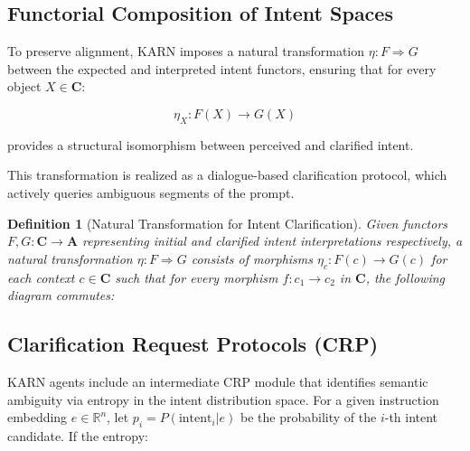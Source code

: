\documentclass[12pt]{article}
\newtheorem{definition}{Definition}
\begin{document}
\subsection{Functorial Composition of Intent Spaces}

To preserve alignment, KARN imposes a natural transformation $\eta: F \Rightarrow G$ between the expected and interpreted intent functors, ensuring that for every object $X \in \mathbf{C}$:

$$\eta_X: F(X) \rightarrow G(X)$$

provides a structural isomorphism between perceived and clarified intent.

This transformation is realized as a dialogue-based clarification protocol, which actively queries ambiguous segments of the prompt.

\begin{definition}[Natural Transformation for Intent Clarification]
Given functors $F, G: \mathbf{C} \rightarrow \mathbf{A}$ representing initial and clarified intent interpretations respectively, a natural transformation $\eta: F \Rightarrow G$ consists of morphisms $\eta_c: F(c) \rightarrow G(c)$ for each context $c \in \mathbf{C}$ such that for every morphism $f: c_1 \rightarrow c_2$ in $\mathbf{C}$, the following diagram commutes:

\begin{center}
\end{center}
\end{definition}

\subsection{Clarification Request Protocols (CRP)}

KARN agents include an intermediate CRP module that identifies semantic ambiguity via entropy in the intent distribution space. For a given instruction embedding $e \in \mathbb{R}^n$, let $p_i = P(\text{intent}_i | e)$ be the probability of the $i$-th intent candidate. If the entropy:
\end{document}
